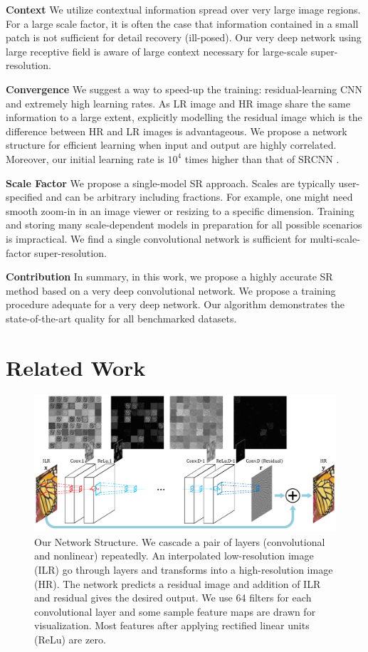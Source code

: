 \documentclass[10pt,twocolumn,letterpaper]{article}
\begin{document}
\textbf{Context} We utilize contextual information spread over very large image regions. For a large scale factor, it is often the case that information contained in a small patch is not sufficient for detail recovery (ill-posed). Our very deep network using large receptive field is aware of large context necessary for large-scale super-resolution.

\textbf{Convergence} We suggest a way to speed-up the training: residual-learning CNN and extremely high learning rates. As LR image and HR image share the same information to a large extent, explicitly modelling the residual image which is the difference between HR and LR images is advantageous. We propose a network structure for efficient learning when input and output are highly correlated. Moreover, our initial learning rate is $10^4$ times higher than that of SRCNN \cite{dong2015image}.

\textbf{Scale Factor} We propose a single-model SR approach. Scales are typically user-specified and can be arbitrary including fractions. For example, one might need smooth zoom-in in an image viewer or resizing to a specific dimension. Training and storing many scale-dependent models in preparation for all possible scenarios is impractical. We find a single convolutional network is sufficient for multi-scale-factor super-resolution.


\textbf{Contribution} In summary, in this work, we propose a highly accurate SR method based on a very deep convolutional network. We propose a training procedure adequate for a very deep network. Our algorithm demonstrates the state-of-the-art quality for all benchmarked datasets.

\section{Related Work}
\begin{figure}[t]
\includegraphics[width=\textwidth]{figs/fig2_sffsr.pdf}
\caption{Our Network Structure. We cascade a pair of layers (convolutional and nonlinear) repeatedly. An interpolated low-resolution image (ILR) go through layers and transforms into a high-resolution image (HR). The network predicts a residual image and addition of ILR and residual gives the desired output. We use 64 filters for each convolutional layer and some sample feature maps are drawn for visualization. Most features after applying rectified linear units (ReLu) are zero.}
\label{fig:network}
\end{figure}
\end{document}
